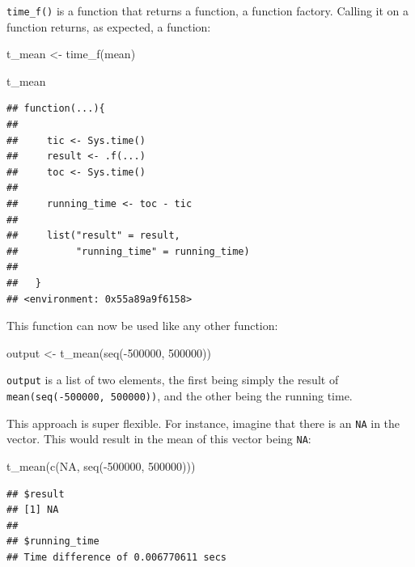\documentclass[
]{article}
\newenvironment{Shaded}{\begin{snugshade}}{\end{snugshade}}
\newcommand{\ConstantTok}[1]{\textcolor[rgb]{0.00,0.00,0.00}{#1}}
\newcommand{\DecValTok}[1]{\textcolor[rgb]{0.00,0.00,0.81}{#1}}
\newcommand{\FunctionTok}[1]{\textcolor[rgb]{0.00,0.00,0.00}{#1}}
\newcommand{\NormalTok}[1]{#1}
\newcommand{\OtherTok}[1]{\textcolor[rgb]{0.56,0.35,0.01}{#1}}
\newcommand{\SpecialCharTok}[1]{\textcolor[rgb]{0.00,0.00,0.00}{#1}}
\begin{document}
\texttt{time\_f()} is a function that returns a function, a function factory. Calling it on a function returns, as expected,
a function:

\begin{Shaded}
\begin{Highlighting}[]
\NormalTok{t\_mean }\OtherTok{\textless{}{-}} \FunctionTok{time\_f}\NormalTok{(mean)}

\NormalTok{t\_mean}
\end{Highlighting}
\end{Shaded}

\begin{verbatim}
## function(...){
## 
##     tic <- Sys.time()
##     result <- .f(...)
##     toc <- Sys.time()
## 
##     running_time <- toc - tic
## 
##     list("result" = result,
##          "running_time" = running_time)
## 
##   }
## <environment: 0x55a89a9f6158>
\end{verbatim}

This function can now be used like any other function:

\begin{Shaded}
\begin{Highlighting}[]
\NormalTok{output }\OtherTok{\textless{}{-}} \FunctionTok{t\_mean}\NormalTok{(}\FunctionTok{seq}\NormalTok{(}\SpecialCharTok{{-}}\DecValTok{500000}\NormalTok{, }\DecValTok{500000}\NormalTok{))}
\end{Highlighting}
\end{Shaded}

\texttt{output} is a list of two elements, the first being simply the result of \texttt{mean(seq(-500000,\ 500000))}, and the other
being the running time.

This approach is super flexible. For instance, imagine that there is an \texttt{NA} in the vector. This would result in
the mean of this vector being \texttt{NA}:

\begin{Shaded}
\begin{Highlighting}[]
\FunctionTok{t\_mean}\NormalTok{(}\FunctionTok{c}\NormalTok{(}\ConstantTok{NA}\NormalTok{, }\FunctionTok{seq}\NormalTok{(}\SpecialCharTok{{-}}\DecValTok{500000}\NormalTok{, }\DecValTok{500000}\NormalTok{)))}
\end{Highlighting}
\end{Shaded}

\begin{verbatim}
## $result
## [1] NA
## 
## $running_time
## Time difference of 0.006770611 secs
\end{verbatim}
\end{document}
